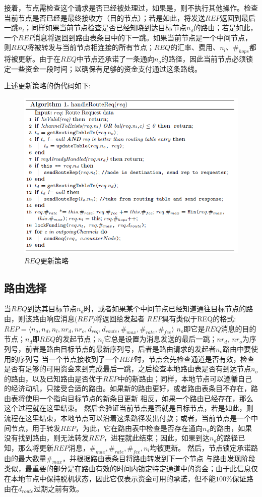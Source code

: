 \documentclass[12pt,a4paper]{article}
\begin{document}
接着，节点需检查这个请求是否已经被处理过，如果是，则不执行其他操作。检查当前节点是否已经是最终接收方（目的节点）；若是如此，将发送$REP$返回到最后一跳$n_l$；同样如果当前节点检查是否已经知晓到达目标节点$n_d$的路由；若是如此，一个$REP$消息将返回到路由表条目中的下一跳。如果当前节点是一个中间节点，则$REQ$将被转发与当前节点相连接的所有节点；$REQ$的汇率、费用、$n_l$、$\#_{hops}$都将被更新。由于在$REQ$中节点还承诺了一条通向$n_o$的路径，因此当前节点必须锁定一些资金一段时间；以确保有足够的资金支付通过这条路线。

上述更新策略的伪代码如下:
\begin{figure}[htb]
\centering
\includegraphics[width=12cm]{req_update}
\caption{$REQ$更新策略}
\end{figure}

\subsection{路由选择}
当$REQ$到达其目标节点$n_d$时，或者如果某个中间节点已经知道通往目标节点的路由，则该路由响应消息($REP$)将返回给发起者
$REP$具有类似于REQ的格式:
$REP=\langle n_o, n_d, n_l, {nr}_d, {nr}_o, d_{req},d_{route}, \#_{max}, \#_{rate},\#_{fee}\rangle$
$n_o$即它是$REQ$消息的目的节点；$n_d$即$REQ$的发起节点；$n_l$它总是设置为消息发送的最后一跳；${nr}_d,\ {nr}_o$为序列号，前者是路由目标节点的最新序列号，后者是路由请求的发起者$n_o$路由中要使用的序列号
当一个节点接收到了一个$REP$时，节点会先检查通道是否有效，检查是否有足够的可用资金来到完成最后一跳，之后检查本地路由表是否有到达节点$n_o$的路由，以及已知路由是否优于$REP$中的新路由；同样，本地节点可以遵循自己的经济动机，只接受合适的路由。如果新的路由更好，或者路由表条目不存在，路由表将使用一个指向目标节点的新条目更新
相反，如果一个路由已经存在，那么这个过程就在这里结束。
然后会验证当前节点是否就是目标节点，若是如此，则流程在这里结束，本地节点可以沿着这条路径发出付款；或者，当前节点是一个中间节点，用于转发$REP$，为此，它在路由表中检查是否存在通向$n_d$的路由，如果没有找到路由，则无法转发$REP$，进程就此结束；因此，如果到达$n_d$的路径已知，那么将更新$REP$消息，$\#_{max},\#_{rate},\#_{fee},n_l$均被更新。
然后，节点锁定承诺路由的最大数量$\#_{max}$，并根据路由表条目将路由转发到下一个节点
与路由发现阶段类似，最重要的部分是在路由有效的时间内锁定特定通道中的资金；由于此信息仅在本地节点中保持脱机状态，因此它仅表示资金可用的承诺，但不能$100\%$保证路由在$d_{route}$过期之前有效。
\end{document}
